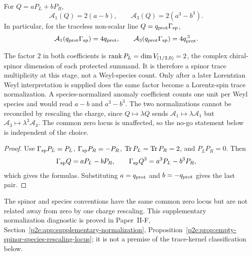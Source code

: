 \documentclass[12pt,a4paper]{article}
\begin{document}
\begin{proposition}
\label{p2:prop:protected-anomaly-traces}
For \(Q=aP_L+bP_R\),
\[
        \mathcal A_1(Q)=2(a-b),
        \qquad
        \mathcal A_3(Q)=2(a^3-b^3).
\]
In particular, for the traceless non-scalar line
\(Q=q_{\rm prot}\Gamma_{\rm sp}\),
\[
        \mathcal A_1(q_{\rm prot}\Gamma_{\rm sp})=4q_{\rm prot},
        \qquad
        \mathcal A_3(q_{\rm prot}\Gamma_{\rm sp})
        =4q_{\rm prot}^{\,3}.
\]

The factor \(2\) in both coefficients is
\(\operatorname{rank} P_L=\dim V_{(1/2,0)}=2\), the complex chiral-spinor dimension of each
protected summand.  It is therefore a spinor trace multiplicity at this stage,
not a Weyl-species count.  Only after a later Lorentzian Weyl interpretation
is supplied does the same factor become a Lorentz-spin trace normalization.  A species-normalized anomaly
coefficient counts one unit per Weyl species and would read \(a-b\) and
\(a^3-b^3\).  The two normalizations cannot be reconciled by rescaling the
charge, since \(Q\mapsto\lambda Q\) sends \(\mathcal A_1\mapsto\lambda\mathcal
A_1\) but \(\mathcal A_3\mapsto\lambda^3\mathcal A_3\).  The common zero locus
is unaffected, so the no-go statement below is independent of the choice.
\end{proposition}

\begin{proof}
Use
\(\Gamma_{\rm sp}P_L=P_L\),
\(\Gamma_{\rm sp}P_R=-P_R\),
\(\operatorname{Tr} P_L=\operatorname{Tr} P_R=2\), and
\(P_LP_R=0\).  Then
\[
\Gamma_{\rm sp}Q=aP_L-bP_R,
\qquad
\Gamma_{\rm sp}Q^3=a^3P_L-b^3P_R,
\]
which gives the formulas.  Substituting
\(a=q_{\rm prot}\) and \(b=-q_{\rm prot}\) gives the
last pair.
\end{proof}

\begin{remark}
The spinor and species conventions have the same common zero locus but are
not related away from zero by one charge rescaling.  This supplementary
normalization diagnostic is proved in
Paper~II-F, Section~\ref{p2e:app:supplementary-normalization},
Proposition~\ref{p2e:prop:empty-spinor-species-rescaling-locus}; it is not a
premise of the trace-kernel classification below.
\end{remark}
\end{document}
